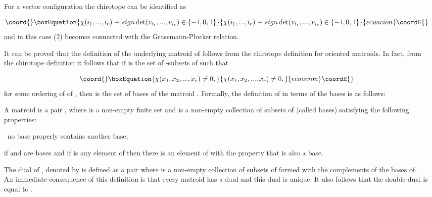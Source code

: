 \documentclass[a4paper,12pt]{article}
\begin{document}
For a vector configuration the chirotope \myHighlight{$\chi $}\coordHE{} can be identified as

\begin{equation}\coord{}\boxEquation{
\chi (i_{1},...,i_{r})\equiv sign\det (v_{i_{1}},...,v_{i_{r}})\in \{-1,0,1\}
\label{3}
}{
\chi (i_{1},...,i_{r})\equiv sign\det (v_{i_{1}},...,v_{i_{r}})\in \{-1,0,1\}
}{ecuacion}\coordE{}\end{equation}
and in this case (2) becomes connected with the Grassmann-Plucker relation.

It can be proved that the definition of the underlying matroid \coordHE{} of \coordHE{} follows from the chirotope definition for oriented matroids. In
fact, from the chirotope definition it follows that if \coordHE{} is the
set of \coordHE{}-subsets of \coordHE{} such that

\begin{equation}\coord{}\boxEquation{
\chi (x_{1},x_{2},...,x_{r})\neq 0,  \label{4}
}{
\chi (x_{1},x_{2},...,x_{r})\neq 0,  }{ecuacion}\coordE{}\end{equation}
for some ordering of \coordHE{} of \coordHE{}, then \coordHE{} is the set of bases of the matroid \coordHE{}. Formally, the
definition of \coordHE{} in terms of the bases is as follows:

A matroid \coordHE{} is a pair \coordHE{}, where \coordHE{} is a non-empty finite
set and \coordHE{} is a non-empty collection of subsets of \coordHE{} (called
bases) satisfying the following properties:

\coordHE{}  \coordHE{}\textit{\ }no base properly contains another
base;

\coordHE{}  \coordHE{} if \coordHE{} and \coordHE{} are bases and if \coordHE{} is
any element of \coordHE{} then there is an element \coordHE{} of \coordHE{} with the
property that \coordHE{} is also a base.

The dual of \coordHE{}, denoted by \coordHE{} is defined as a pair \coordHE{} where \coordHE{} is a non-empty collection of subsets
of \coordHE{} formed with the complements of the bases of \coordHE{}. An immediate
consequence of this definition is that every matroid has a dual and this
dual is unique. It also follows that the double-dual \coordHE{} is
equal to \coordHE{}.
\end{document}
